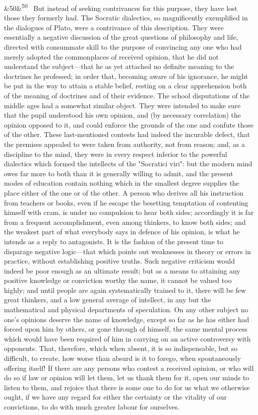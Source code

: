 \documentclass[12pt]{article}
\newcommand{\para}[1][]{\par\noindent\ifx&#1&\else\textsuperscript{\footnotesize #1}~\fi}
\begin{document}
\para[50] But instead of seeking contrivances for this purpose, they have lost those they formerly had. The Socratic dialectics, so magnificently exemplified in the dialogues of Plato, were a contrivance of this description. They were essentially a negative discussion of the great questions of philosophy and life, directed with consummate skill to the purpose of convincing any one who had merely adopted the commonplaces of received opinion, that he did not understand the subject---that he as yet attached no definite meaning to the doctrines he professed; in order that, becoming aware of his ignorance, he might be put in the way to attain a stable belief, resting on a clear apprehension both of the meaning of doctrines and of their evidence. The school disputations of the middle ages had a somewhat similar object. They were intended to make sure that the pupil understood his own opinion, and (by necessary correlation) the opinion opposed to it, and could enforce the grounds of the one and confute those of the other. These last-mentioned contests had indeed the incurable defect, that the premises appealed to were taken from authority, not from reason; and, as a discipline to the mind, they were in every respect inferior to the powerful dialectics which formed the intellects of the "Socratici viri": but the modern mind owes far more to both than it is generally willing to admit, and the present modes of education contain nothing which in the smallest degree supplies the place either of the one or of the other. A person who derives all his instruction from teachers or books, even if he escape the besetting temptation of contenting himself with cram, is under no compulsion to hear both sides; accordingly it is far from a frequent accomplishment, even among thinkers, to know both sides; and the weakest part of what everybody says in defence of his opinion, is what he intends as a reply to antagonists. It is the fashion of the present time to disparage negative logic---that which points out weaknesses in theory or errors in practice, without establishing positive truths. Such negative criticism would indeed be poor enough as an ultimate result; but as a means to attaining any positive knowledge or conviction worthy the name, it cannot be valued too highly; and until people are again systematically trained to it, there will be few great thinkers, and a low general average of intellect, in any but the mathematical and physical departments of speculation. On any other subject no one's opinions deserve the name of knowledge, except so far as he has either had forced upon him by others, or gone through of himself, the same mental process which would have been required of him in carrying on an active controversy with opponents. That, therefore, which when absent, it is so indispensable, but so difficult, to create, how worse than absurd is it to forego, when spontaneously offering itself! If there are any persons who contest a received opinion, or who will do so if law or opinion will let them, let us thank them for it, open our minds to listen to them, and rejoice that there is some one to do for us what we otherwise ought, if we have any regard for either the certainty or the vitality of our convictions, to do with much greater labour for ourselves.
\end{document}
